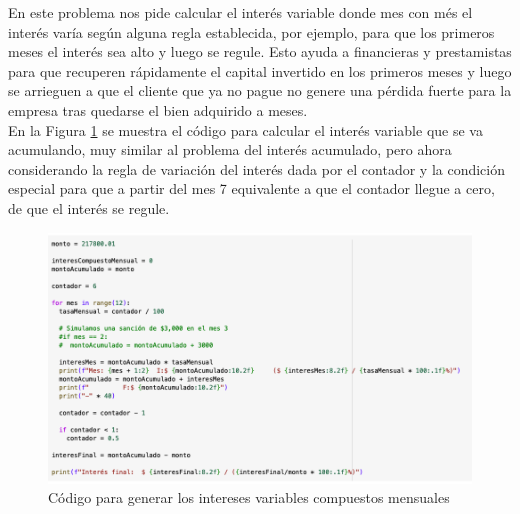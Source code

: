 \documentclass{article}
\begin{document}
En este problema nos pide calcular el interés variable donde mes con més el interés varía según alguna regla establecida, por ejemplo, para que los primeros meses el interés sea alto y luego se regule. Esto ayuda a financieras y prestamistas para que recuperen rápidamente el capital invertido en los primeros meses y luego se arrieguen a que el cliente que ya no pague no genere una pérdida fuerte para la empresa tras quedarse el bien adquirido a meses.
\\[12pt]
En la Figura \ref{fig:s107-1} se muestra el código para calcular el interés variable que se va acumulando, muy similar al problema del interés acumulado, pero ahora considerando la regla de variación del interés dada por el contador y la condición especial para que a partir del mes 7 equivalente a que el contador llegue a cero, de que el interés se regule.
\begin{figure}[!ht]
    \centering
    \begin{minipage}{\textwidth}
        \centering
        \includegraphics[width=\textwidth]{figures/s107-1.png}
    \end{minipage}
    \captionsetup{width=\textwidth}
    \caption{Código para generar los intereses variables compuestos mensuales}
    \label{fig:s107-1}
\end{figure}
\end{document}
